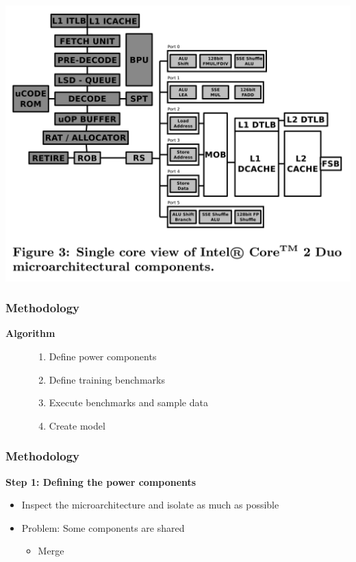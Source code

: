 \documentclass[screen]{beamer}
\begin{document}
\begin{frame}
    \includegraphics{Fig3}
\end{frame}

\begin{frame}
    \frametitle{Methodology}
    \textbf{Algorithm}
    \begin{figure}
    \begin{enumerate}
        \item Define power components
        \item Define training benchmarks
        \item Execute benchmarks and sample data
        \item Create model
    \end{enumerate}
    \end{figure}

\end{frame}



\begin{frame}
    \frametitle{Methodology}
    \textbf{Step 1: Defining the power components}

    \begin{itemize}
        \item Inspect the microarchitecture and isolate as much as possible
        \item Problem: Some components are shared
            \begin{itemize}
                \item Merge
            \end{itemize}
    \end{itemize}


\end{frame}
\end{document}
